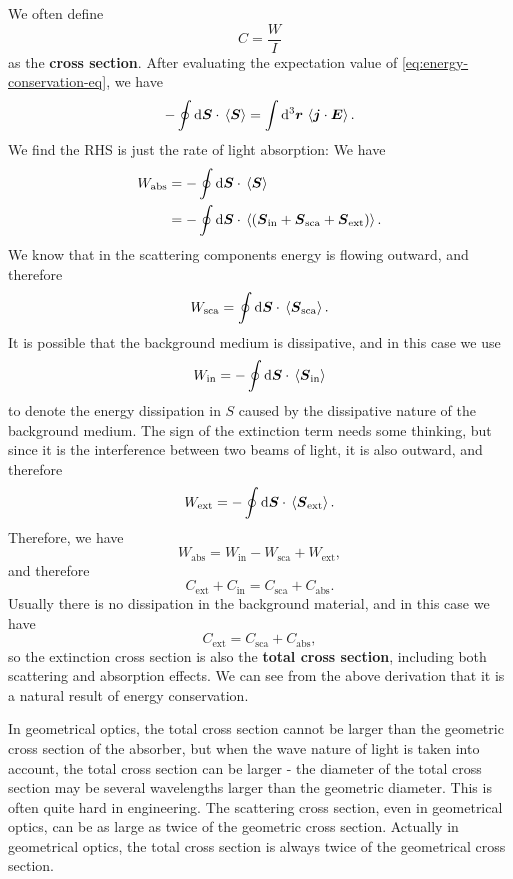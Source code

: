 \documentclass[hyperref, a4paper]{article}
\newcommand*{\concept}[1]{{\textbf{#1}}}
\begin{document}
We often define 
\begin{equation}
    C = \frac{W}{I}
\end{equation}
as the \concept{cross section}. After evaluating the expectation value of \eqref{eq:energy-conservation-eq}, we have 
\[
    - \oint \dd{\vb*{S}} \cdot \expval*{\vb*{S}} = \int \dd[3]{\vb*{r}} \expval*{\vb*{j} \cdot \vb*{E}}.
\]
We find the RHS is just the rate of light absorption: We have 
\[
    \begin{aligned}
        W_\text{abs} &= - \oint \dd{\vb*{S}} \cdot \expval*{\vb*{S}} \\
        &= - \oint \dd{\vb*{S}} \cdot \expval*{(\vb*{S}_\text{in} + \vb*{S}_\text{sca} + \vb*{S}_\text{ext} )}.
    \end{aligned}
\]
We know that in the scattering components energy is flowing outward, and therefore 
\begin{equation}
    W_\text{sca} = \oint \dd{\vb*{S}} \cdot \expval*{\vb*{S}_\text{sca}}.
\end{equation}
It is possible that the background medium is dissipative, and in this case we use 
\begin{equation}
    W_\text{in} = - \oint \dd{\vb*{S}} \cdot \expval*{\vb*{S}_\text{in}}
\end{equation}
to denote the energy dissipation in $S$ caused by the dissipative nature of the background medium. 
The sign of the extinction term needs some thinking, but since it is the interference between two beams 
of light, it is also outward, and therefore 
\begin{equation}
    W_\text{ext} = - \oint \dd{\vb*{S}} \cdot \expval*{\vb*{S}_\text{ext}}.
\end{equation}
Therefore, we have 
\[
    W_\text{abs} = W_\text{in} - W_\text{sca} + W_\text{ext},
\]
and therefore 
\begin{equation}
    C_\text{ext} + C_\text{in} = C_\text{sca} + C_\text{abs}.
\end{equation}
Usually there is no dissipation in the background material, and in this case we have 
\begin{equation}
    C_\text{ext} = C_\text{sca} + C_\text{abs},
\end{equation}
so the extinction cross section is also the \concept{total cross section}, including both scattering 
and absorption effects. We can see from the above derivation that it is a natural result of energy conservation.

In geometrical optics, the total cross section cannot be larger than the geometric
cross section of the absorber, but when the wave nature of light is taken into account, the total cross 
section can be larger - the diameter of the total cross section may be several wavelengths larger than the 
geometric diameter. This is often quite hard in engineering. The scattering cross section, even in geometrical
optics, can be as large as twice of the geometric cross section. Actually in geometrical optics, 
the total cross section is always twice of the geometrical cross section. %
\end{document}
